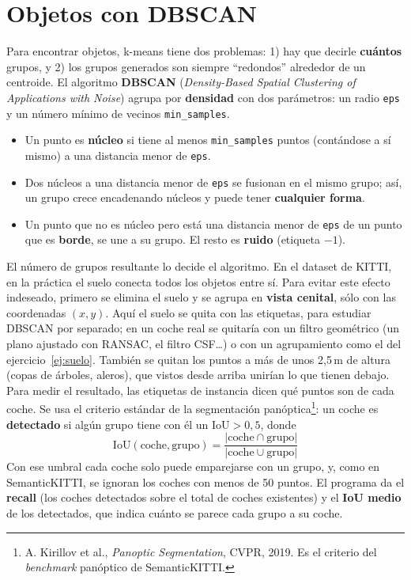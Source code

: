 \documentclass{article}
\begin{document}
\section{Objetos con DBSCAN}
Para encontrar objetos, k-means tiene dos problemas: 1) hay que decirle \textbf{cuántos} grupos, y 2) los grupos generados son siempre ``redondos'' alrededor de un centroide. El algoritmo \textbf{DBSCAN} (\textit{Density-Based Spatial Clustering of Applications with Noise}) agrupa por \textbf{densidad} con dos parámetros: un radio \texttt{eps} y un número mínimo de vecinos \texttt{min\_samples}.
\begin{itemize}
    \item Un punto es \textbf{núcleo} si tiene al menos \texttt{min\_samples} puntos (contándose a sí mismo) a una distancia menor  de \texttt{eps}.
    \item Dos núcleos a una distancia menor de \texttt{eps} se fusionan en el mismo grupo; así, un grupo crece encadenando núcleos y puede tener \textbf{cualquier forma}.
    \item Un punto que no es núcleo pero está una distancia menor de \texttt{eps} de un punto que es \textbf{borde}, se une a su grupo. El resto es \textbf{ruido} (etiqueta $-1$).
\end{itemize}
El número de grupos resultante lo decide el algoritmo. En el dataset de KITTI, en la práctica el suelo conecta todos los objetos entre sí. Para evitar este efecto indeseado, primero se elimina el suelo y se agrupa en \textbf{vista cenital}, sólo con las coordenadas $(x, y)$. Aquí el suelo se quita con las etiquetas, para estudiar DBSCAN por separado; en un coche real se quitaría con un filtro geométrico (un plano ajustado con RANSAC, el filtro CSF\dots) o con un agrupamiento como el del ejercicio~\ref{ej:suelo}. También se quitan los puntos a más de unos 2{,}5\,m de altura (copas de árboles, aleros), que vistos desde arriba unirían lo que tienen debajo. Para medir el resultado, las etiquetas de instancia dicen qué puntos son de cada coche. Se usa el criterio estándar de la segmentación panóptica\footnote{A. Kirillov et al., \textit{Panoptic Segmentation}, CVPR, 2019. Es el criterio del \textit{benchmark} panóptico de SemanticKITTI.}: un coche es \textbf{detectado} si algún grupo tiene con él un $\text{IoU} > 0{,}5$, donde
\[
\text{IoU}(\text{coche}, \text{grupo}) = \frac{|\text{coche} \cap \text{grupo}|}{|\text{coche} \cup \text{grupo}|}
\]
Con ese umbral cada coche solo puede emparejarse con un grupo, y, como en SemanticKITTI, se ignoran los coches con menos de 50 puntos. El programa da el \textbf{recall} (los coches detectados sobre el total de coches existentes) y el \textbf{IoU medio} de los detectados, que indica cuánto se parece cada grupo a su coche.
\end{document}
